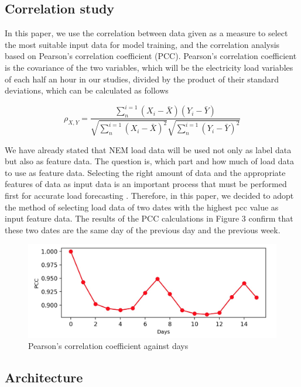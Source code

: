 \documentclass[runningheads,a4paper]{llncs}
\begin{document}
\subsection{Correlation study}

In this paper, we use the correlation between data given as a measure to select the most suitable input data for model training, and the correlation analysis based on Pearson’s correlation coefficient (PCC). Pearson's correlation coefficient is the covariance of the two variables, which will be the electricity load variables of each half an hour in our studies, divided by the product of their standard deviations, which can be calculated as follows

\begin{equation}
\rho _{X, Y}=\frac{\sum_{n}^{i=1} (X_{i}-\bar{X})(Y_{i}-\bar{Y})}{\sqrt{\sum_{n}^{i=1} (X_{i}-\bar{X})^{2}}\sqrt{\sum_{n}^{i=1} (Y_{i}-\bar{Y})^{2}}}
\end{equation}

We have already stated that NEM load data will be used not only as label data but also as feature data. The question is, which part and how much of load data to use as feature data. Selecting the right amount of data and the appropriate features of data as input data is an important process that must be performed first for accurate load forecasting \cite{feature_select}. Therefore, in this paper, we decided to adopt the method of selecting load data of two dates with the highest pcc value as input feature data. The results of the PCC calculations in Figure 3 confirm that these two dates are the same day of the previous day and the previous week.

\begin{figure}
\centering
\includegraphics[width=12.1cm]{pcc_figure}
\caption{Pearson's correlation coefficient against days}
\label{fig:helm_figure}
\end{figure}

\subsection{Architecture}
\end{document}
